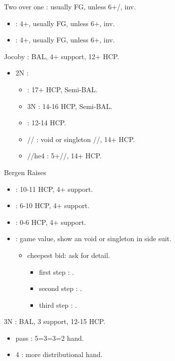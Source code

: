 \documentclass[12pt,twoside,a5paper]{report}%
\begin{document}
	Two over one : usually FG, unless 6+\cl{}/\di{}, inv.
	\begin{itemize}
	\renewcommand{\labelitemi}{}
	\item {} : 4+\cl{}, usually FG, unless 6+\cl{}, inv.
	\item {} : 4+\di{}, usually FG, unless 6+\di{}, inv.
	\end{itemize}

	Jocoby : BAL, 4+\sp{} support, 12+ HCP.
	\begin{itemize}
	\renewcommand{\labelitemi}{}
	\item 2N :
		\begin{itemize}
		\renewcommand{\labelitemi}{--}
		\item {} : 17+ HCP, Semi-BAL.
		\item 3N : 14-16 HCP, Semi-BAL.
		\item {} : 12-14 HCP.
		\item {}// : void or singleton //, 14+ HCP.
		\item {}//he{4} : 5+//, 14+ HCP.
		\end{itemize}
	\end{itemize}

	Bergen Raises
	\begin{itemize}
	\renewcommand{\labelitemi}{}
	\item {} : 10-11 HCP, 4+\sp{} support.
	\item {} : 6-10 HCP, 4+\sp{} support.
	\item {} : 0-6 HCP, 4+\sp{} support.
	\item {} : game value, show an void or singleton in side suit.
		\begin{itemize}
		\renewcommand{\labelitemi}{--}
		\item cheepest bid: ask for detail.
			\begin{itemize}
			\renewcommand{\labelitemi}{--}
				\item first step : \cl{}.
				\item second step : \di{}.
				\item third step : \sp{}.
			\end{itemize}
		\end{itemize}
	\end{itemize}

	3N : BAL, 3\sp{} support, 12-15 HCP.
		\begin{itemize}
		\renewcommand{\labelitemi}{--}
		\item pass : 5=3=3=2 hand.
		\item 4\sp{} : more distributional hand.
		\end{itemize}
\end{document}

